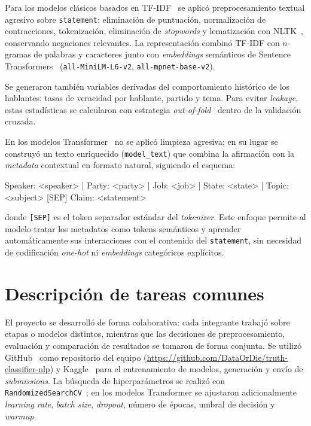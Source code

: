 \documentclass[12pt,a4paper]{article}
\begin{document}
Para los modelos clásicos basados en TF-IDF~\cite{sklearn} se aplicó preprocesamiento textual agresivo sobre \texttt{statement}: eliminación de puntuación, normalización de contracciones, tokenización, eliminación de \emph{stopwords} y lematización con NLTK~\cite{nltk}, conservando negaciones relevantes. La representación combinó TF-IDF con $n$-gramas de palabras y caracteres junto con \emph{embeddings} semánticos de Sentence Transformers~\cite{sbert} (\texttt{all-MiniLM-L6-v2}, \texttt{all-mpnet-base-v2}).

Se generaron también variables derivadas del comportamiento histórico de los hablantes: tasas de veracidad por hablante, partido y tema. Para evitar \emph{leakage}, estas estadísticas se calcularon con estrategia \emph{out-of-fold}~\cite{sklearn} dentro de la validación cruzada.

En los modelos Transformer~\cite{hf_transformers} no se aplicó limpieza agresiva; en su lugar se construyó un texto enriquecido (\texttt{model\_text}) que combina la afirmación con la \emph{metadata} contextual en formato natural, siguiendo el esquema:

\begin{center}
\small\ttfamily
Speaker: <speaker> | Party: <party> | Job: <job> | State: <state> | Topic: <subject> [SEP] Claim: <statement>
\end{center}

donde \texttt{[SEP]} es el token separador estándar del \emph{tokenizer}. Este enfoque permite al modelo tratar los metadatos como tokens semánticos y aprender automáticamente sus interacciones con el contenido del \texttt{statement}, sin necesidad de codificación \emph{one-hot} ni \emph{embeddings} categóricos explícitos.

\section{Descripción de tareas comunes}

El proyecto se desarrolló de forma colaborativa: cada integrante trabajó sobre etapas o modelos distintos, mientras que las decisiones de preprocesamiento, evaluación y comparación de resultados se tomaron de forma conjunta. Se utilizó GitHub~\cite{github} como repositorio del equipo (\url{https://github.com/DataOrDie/truth-classifier-nlp}) y Kaggle~\cite{kaggle} para el entrenamiento de modelos, generación y envío de \emph{submissions}. La búsqueda de hiperparámetros se realizó con \texttt{RandomizedSearchCV}~\cite{sklearn}; en los modelos Transformer se ajustaron adicionalmente \emph{learning rate}, \emph{batch size}, \emph{dropout}, número de épocas, umbral de decisión y \emph{warmup}.
\end{document}
